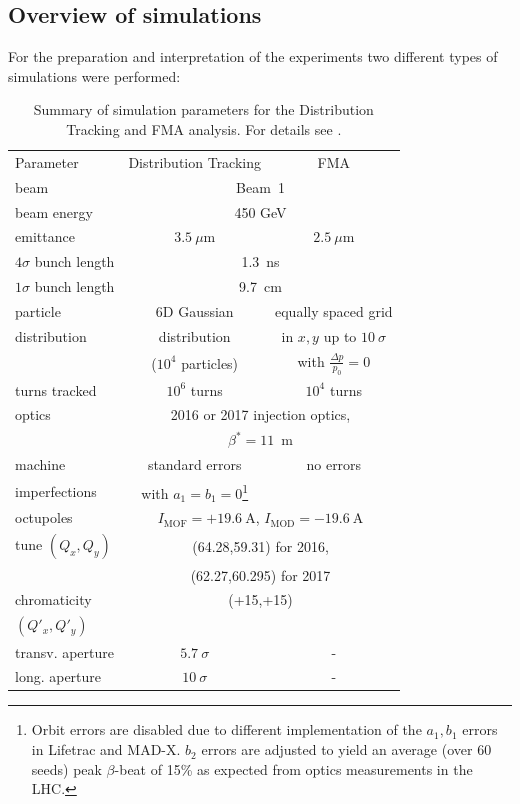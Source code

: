 \documentclass[%
 reprint,
 amsmath,amssymb,
 aps,
prstab,
]{revtex4-1}
\begin{document}
\subsection{Overview of simulations\label{sec:sim}}
For the preparation and interpretation of the experiments two different types of simulations were performed:
\begin{table}[b]
	\caption{\label{tab:sim_param}%
		Summary of simulation parameters for the Distribution Tracking and FMA analysis. For details see \cite{md_sim_hel_res_ex_fitterer,resexmd2017}.
	}
	\begin{ruledtabular}
		\begin{tabular}{lcc}
			Parameter & Distribution Tracking & FMA \\
			\colrule
			beam &\multicolumn{2}{c}{Beam~1} \\
			beam energy &\multicolumn{2}{c}{450 GeV} \\
			emittance & $3.5~\mu$m& $2.5~\mu$m\\
			$4\sigma$ bunch length & \multicolumn{2}{c}{1.3~ns}\\
			$1\sigma$ bunch length & \multicolumn{2}{c}{9.7~cm}\\
			particle & 6D Gaussian & equally spaced grid\\
			distribution &  distribution & in $x,y$ up to $10~\sigma$\\
			&  ($10^4$ particles) & with $\frac{\Delta p}{p_0}=0$\\
			turns tracked & $10^6$ turns & $10^4$ turns \\\hline
			optics & \multicolumn{2}{c}{2016 or 2017 injection optics,}\\
			& \multicolumn{2}{c}{$\beta^*=11$~m}\\
			machine  & standard errors & no errors \\
			imperfections &with $a_1=b_1=0$\footnote{Orbit errors are disabled due to different implementation of the $a_1,b_1$ errors in Lifetrac and MAD-X. $b_2$ errors are adjusted to yield an average (over 60 seeds) peak $\beta$-beat of 15\% as expected from optics measurements in the LHC.} &  \\
			octupoles  & \multicolumn{2}{c}{$I_{\mathrm{MOF}}=+19.6~\mathrm{A}$, $I_{\mathrm{MOD}}=-19.6~\mathrm{A}$}\\
			tune $(Q_x,Q_y)$ & \multicolumn{2}{c}{(64.28,59.31) for 2016,}\\
			& \multicolumn{2}{c}{(62.27,60.295) for 2017}\\
			chromaticity & \multicolumn{2}{c}{(+15,+15)}\\
			 $(Q'_x,Q'_y)$ & & \\\hline
			 transv. aperture & $5.7~\sigma$ & - \\
			 long. aperture & $10~\sigma$ & - \\
		\end{tabular}
	\end{ruledtabular}
\end{table}
\end{document}
